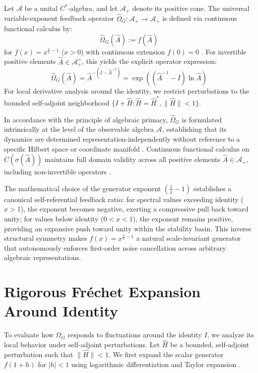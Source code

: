 \documentclass[11pt,a4paper]{article}
\begin{document}
Let $\mathcal{A}$ be a unital $C^*$-algebra, and let $\mathcal{A}_+$ denote its positive cone. The universal variable-exponent feedback operator $\hat{\Omega}_G : \mathcal{A}_+ \to \mathcal{A}_+$ is defined via continuous functional calculus by:
\begin{equation}
\hat{\Omega}_G(\hat{A}) := f(\hat{A})
\end{equation}
for $f(x) = x^{\frac{1}{x}-1}$ ($x > 0$) with continuous extension $f(0) = 0$ \cite{Murphy,Cartan}. For invertible positive elements $\hat{A} \in \mathcal{A}_+^\times$, this yields the explicit operator expression:
\begin{equation}
\hat{\Omega}_G(\hat{A}) = \hat{A}^{-(I - \hat{A}^{-1})} = \exp\left((\hat{A}^{-1} - I)\ln\hat{A}\right)
\end{equation}
For local derivative analysis around the identity, we restrict perturbations to the bounded self-adjoint neighborhood $\{I + \hat{H} : \hat{H} = \hat{H}^*, \|\hat{H}\| < 1\}$.

In accordance with the principle of algebraic primacy, $\hat{\Omega}_G$ is formulated intrinsically at the level of the observable algebra $\mathcal{A}$, establishing that its dynamics are determined representation-independently without reference to a specific Hilbert space or coordinate manifold \cite{Connes,Hall}. Continuous functional calculus on $C(\sigma(\hat{A}))$ maintains full domain validity across all positive elements $\hat{A} \in \mathcal{A}_+$, including non-invertible operators \cite{Pedersen}.

The mathematical choice of the generator exponent $\left(\frac{1}{x} - 1\right)$ establishes a canonical self-referential feedback ratio: for spectral values exceeding identity ($x > 1$), the exponent becomes negative, exerting a compressive pull back toward unity; for values below identity ($0 < x < 1$), the exponent remains positive, providing an expansive push toward unity within the stability basin. This inverse structural symmetry makes $f(x) = x^{\frac{1}{x}-1}$ a natural scale-invariant generator that autonomously enforces first-order noise cancellation across arbitrary algebraic representations.

\section{Rigorous Fr\'echet Expansion Around Identity}

To evaluate how $\hat{\Omega}_G$ responds to fluctuations around the identity $I$, we analyze its local behavior under self-adjoint perturbations. Let $\hat{H}$ be a bounded, self-adjoint perturbation such that $\|\hat{H}\| < 1$. We first expand the scalar generator $f(1+h)$ for $|h| < 1$ using logarithmic differentiation and Taylor expansion \cite{Cartan}.
\end{document}
